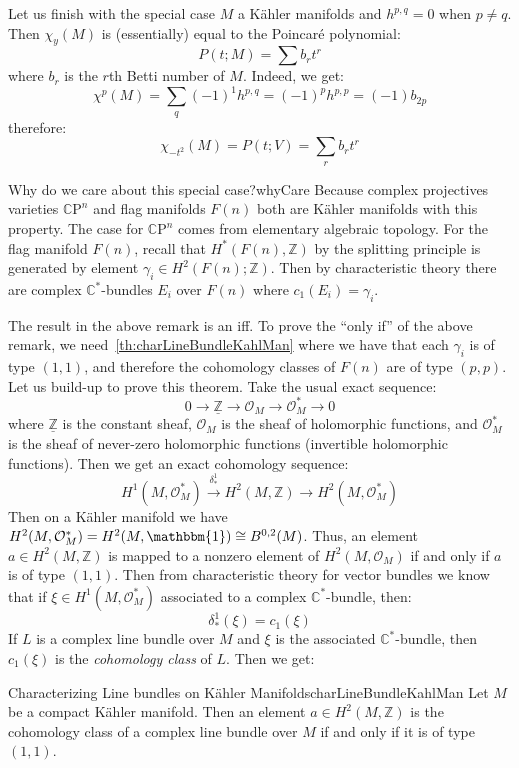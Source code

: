 \documentclass{book}
\newcommand{\Z}{{\mathbb{Z}}}
\newcommand{\C}{{\mathbb{C}}}
\newcommand{\CO}{{\mathcal{O}}}
\newcommand{\CP}{{\mathbb{C}\mathrm{P}}}
\begin{document}
Let us finish with the special case $M$ a K\"ahler manifolds and $h^{p,q} = 0$ when $p\ne q$. Then $\chi_y(M)$
is (essentially) equal to the Poincar\'e polynomial:
\[
  P(t; M) = \sum b_rt^r
\]
where $b_r$ is the $r$th Betti number of $M$. Indeed, we get:
\[
  \chi^p(M) = \sum_q (-1)^1 h^{p,q} = (-1)^p h^{p,p} = (-1)b_{2p}
\]
therefore:
\[
  \chi_{-t^2}(M) = P(t;V) = \sum_r b_rt^r
\]
\begin{titledBox}{Why do we care about this special case?}{whyCare}
   Because complex projectives varieties $\CP^n$ and flag manifolds
  $F(n)$ both are K\"ahler manifolds with this property.
  The case for $\CP^n$ comes from elementary algebraic
  topology. For the flag manifold $F(n)$, recall that $H^*(F(n), \Z)$ by the splitting principle is generated by
  element $\gamma_i \in H^2(F(n); \Z)$. Then by characteristic theory there are complex $\C^*$-bundles $E_i$
  over $F(n)$ where $c_1(E_i) = \gamma_i$.
\end{titledBox}
The result in the above remark is an iff. To prove the ``only if'' of the above remark, we
need~\cref{th:charLineBundleKahlMan} where we have that each $\gamma_i$ is of type $(1,1)$, and therefore the
cohomology classes of $F(n)$ are of type $(p,p)$. Let us build-up to prove this theorem. Take the usual exact
sequence:
\[
  0 \to \underline{\Z} \to \CO_M \to \CO_M^* \to 0
\]
where $\underline{\Z}$ is the constant sheaf, $\CO_M$ is the sheaf of holomorphic functions, and $\CO_M^*$ is
the sheaf of never-zero holomorphic functions (invertible holomorphic functions). Then we get an exact
cohomology sequence:
\[
  H^1(M, \CO_M^*) \xrightarrow{\delta_*^1} H^2(M, \Z) \to H^2(M, \CO_M^*)
\]
Then on a K\"ahler manifold we have $H^2(M, \CO_M^*) = H^2(M, \mathbbm{1}) \cong B^{0,2}(M)$. Thus, an element
$a \in H^2(M, \Z)$ is mapped to a nonzero element of $H^2(M, \CO_M)$ if and only if $a$ is of type $(1,1)$.
Then from characteristic theory for vector bundles we know that if $\xi \in H^1(M, \CO_M^*)$ associated to a complex
$\C^*$-bundle, then:
\[
  \delta_*^1(\xi) = c_1(\xi)
\]
If $L$ is a complex line bundle over $M$ and $\xi$ is the associated $\C^*$-bundle, then $c_1(\xi)$ is the
\emph{cohomology class} of $L$. Then we get:

\begin{thm}{Characterizing Line bundles on K\"ahler Manifolds}{charLineBundleKahlMan}
  Let $M$ be a compact K\"ahler manifold. Then an element $a \in H^2(M, \Z)$ is the cohomology class of
  a complex line bundle over $M$ if and only if it is of type $(1,1)$.
\end{thm}
\end{document}
